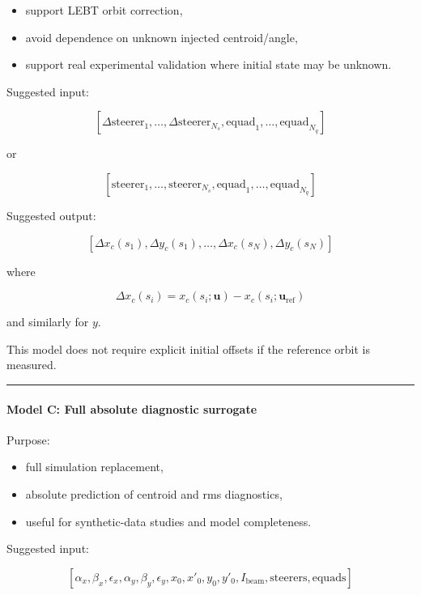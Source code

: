 \documentclass[
]{article}
\providecommand{\tightlist}{%
  \setlength{\itemsep}{0pt}\setlength{\parskip}{0pt}}
\begin{document}
\begin{itemize}
\tightlist
\item
  support LEBT orbit correction,
\item
  avoid dependence on unknown injected centroid/angle,
\item
  support real experimental validation where initial state may be
  unknown.
\end{itemize}

Suggested input:

\[
[
\Delta \mathrm{steerer}_1,\ldots,\Delta \mathrm{steerer}_{N_s},
\mathrm{equad}_1,\ldots,\mathrm{equad}_{N_q}
]
\]

or

\[
[
\mathrm{steerer}_1,\ldots,\mathrm{steerer}_{N_s},
\mathrm{equad}_1,\ldots,\mathrm{equad}_{N_q}
]
\]

Suggested output:

\[
[
\Delta x_c(s_1),\Delta y_c(s_1),\ldots,
\Delta x_c(s_N),\Delta y_c(s_N)
]
\]

where

\[
\Delta x_c(s_i)
=
x_c(s_i;\mathbf{u})
-
x_c(s_i;\mathbf{u}_{\mathrm{ref}})
\]

and similarly for \(y\).

This model does not require explicit initial offsets if the reference
orbit is measured.

\begin{center}\rule{0.5\linewidth}{0.5pt}\end{center}

\hypertarget{model-c-full-absolute-diagnostic-surrogate}{%
\paragraph{Model C: Full absolute diagnostic
surrogate}\label{model-c-full-absolute-diagnostic-surrogate}}

Purpose:

\begin{itemize}
\tightlist
\item
  full simulation replacement,
\item
  absolute prediction of centroid and rms diagnostics,
\item
  useful for synthetic-data studies and model completeness.
\end{itemize}

Suggested input:

\[
[
\alpha_x,\beta_x,\epsilon_x,
\alpha_y,\beta_y,\epsilon_y,
x_0,x'_0,y_0,y'_0,
I_{\mathrm{beam}},
\mathrm{steerers},
\mathrm{equads}
]
\]
\end{document}
